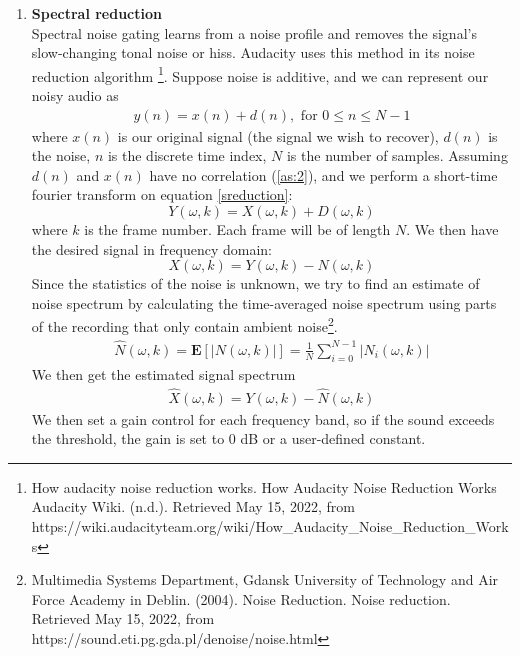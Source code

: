 \begin{enumerate}
    \item \textbf{Spectral reduction}\\
    Spectral noise gating learns from a noise profile and removes the signal's slow-changing tonal noise or hiss. Audacity uses this method in its noise reduction algorithm \footnote{How audacity noise reduction works. How Audacity Noise Reduction Works \- Audacity Wiki. (n.d.). Retrieved May 15, 2022, from https://wiki.audacityteam.org/wiki/How\_Audacity\_Noise\_Reduction\_Works}.
    Suppose noise is additive, and we can represent our noisy audio as
    \begin{align}\label{sreduction} 
    y(n) = x(n) + d(n), \text{ for } 0 \leq n \leq N-1 
    \end{align}
    where $x(n)$ is our original signal (the signal we wish to recover), $d(n)$ is the noise, $n$ is the discrete time index,
    $N$ is the number of samples. 
    Assuming $d(n)$ and $x(n)$ have no correlation (\cref{as:2}), and we perform a short-time fourier transform on equation \cref{sreduction}:
    \[Y(\omega,k)= X(\omega,k) + D(\omega,k)\]
    where $k$ is the frame number. Each frame will be of
    length $N$. We then have the desired signal in frequency domain:
    \[X(\omega,k) = Y(\omega,k) - N(\omega,k)\]
    Since the statistics of the noise is unknown, we try to find an estimate of noise spectrum by calculating the time-averaged
    noise spectrum using parts of the recording that only contain ambient noise\footnote{Multimedia Systems Department, Gdansk University of Technology and Air Force Academy in Deblin. (2004). Noise Reduction. Noise reduction. Retrieved May 15, 2022, from https://sound.eti.pg.gda.pl/denoise/noise.html}.
    \begin{align} 
    \hat{N}(\omega,k) = \textbf{E}[|N(\omega,k)|] = \frac{1}{N}\sum_{i=0}^{N-1}|N_i(\omega,k)|
    \end{align}
    We then get the estimated signal spectrum
    \begin{align}
    \hat{X}(\omega,k) = Y(\omega,k) - \hat{N}(\omega,k)
    \end{align}
    We then set a gain control for each frequency band, so if the sound exceeds the threshold, the gain is set to 0 dB or a user-defined
    constant.
\end{enumerate}
